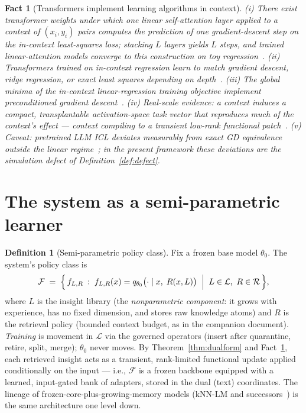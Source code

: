 \documentclass[11pt]{article}
\theoremstyle{plain}
\newtheorem{fact}[theorem]{Fact}            %
\theoremstyle{definition}
\newtheorem{definition}[theorem]{Definition}
\theoremstyle{remark}
\newcommand{\cF}{\mathcal{F}}
\newcommand{\cL}{\mathcal{L}}
\newcommand{\cR}{\mathcal{R}}
\begin{document}
\begin{fact}[Transformers implement learning algorithms in context]
\label{fact:icl-gd}
(i) There exist transformer weights under which one linear self-attention
layer applied to a context of $(x_i, y_i)$ pairs computes the prediction of
one gradient-descent step on the in-context least-squares loss; stacking $L$
layers yields $L$ steps, and \emph{trained} linear-attention models converge
to this construction on toy regression~\cite{vonoswald}. (ii) Transformers
trained on in-context regression learn to match gradient descent, ridge
regression, or exact least squares depending on depth~\cite{akyurek}.
(iii) The global minima of the in-context linear-regression training
objective implement \emph{preconditioned} gradient descent~\cite{ahn}.
(iv) Real-scale evidence: a context induces a compact, transplantable
activation-space \emph{task vector} that reproduces much of the context's
effect --- context compiling to a transient low-rank functional
patch~\cite{taskvectors,functionvectors}. (v) Caveat: pretrained LLM ICL
deviates measurably from exact GD equivalence outside the linear
regime~\cite{shen}; in the present framework these deviations are the
simulation defect of Definition~\ref{def:defect}.
\end{fact}

\section{The system as a semi-parametric learner}\label{sec:semiparam}

\begin{definition}[Semi-parametric policy class]\label{def:semiparam}
Fix a frozen base model $\theta_0$. The system's policy class is
\[
  \cF \;=\; \Bigl\{\, f_{L, R} \;:\;
  f_{L,R}(x) = q_{\theta_0}\bigl( \cdot \mid x,\; R(x, L) \bigr)
  \;\Bigm|\; L \in \cL,\ R \in \cR \,\Bigr\},
\]
where $L$ is the insight library (the \emph{nonparametric component}: it
grows with experience, has no fixed dimension, and stores raw knowledge
atoms) and $R$ is the retrieval policy (bounded context budget, as in the
companion document). \emph{Training} is movement in $\cL$ via the governed
operators (insert after quarantine, retire, split, merge); $\theta_0$ never
moves. By Theorem~\ref{thm:dualform} and Fact~\ref{fact:icl-gd}, each
retrieved insight acts as a transient, rank-limited functional update
applied conditionally on the input --- i.e., $\cF$ is a frozen backbone
equipped with a learned, input-gated bank of adapters, stored in the dual
(text) coordinates. The lineage of frozen-core-plus-growing-memory models
(kNN-LM and successors~\cite{knnlm}) is the same architecture one level
down.
\end{definition}
\end{document}
